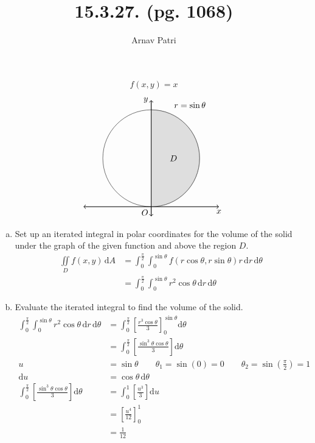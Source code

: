 \documentclass[12pt]{article}
\title{15.3.27. (pg. 1068)}
\author{Arnav Patri}
\renewcommand{\d}{\text{d}}
\begin{document}
	\maketitle
	\thispagestyle{empty}
	\[f(x, y) = x\]
	\[\begin{tikzpicture}[scale = 4]
		\draw[<->, thick] (-0.7, 0) -- (0.7, 0) node[below]{$x$};
		\draw[<->, thick] (0, -0.1) -- (0, 1.1) node[left]{$y$};
			\node[anchor = north east] at (0, 0) {$O$};
		\draw[radius = 0.5] (0, 0.5) circle;
		\draw[fill = lightgray, opacity = 0.5] (0, 0.5) -- (-90:0) arc(-90:90:0.5) -- cycle;
			\node at (0.23, 0.5) {$D$};
			\node at (0.4, 1.05){$r = \sin\theta$};
	\end{tikzpicture}\]
	\begin{enumerate}[(a)]
		\item
			Set up an iterated integral in polar coordinates for the volume of the solid under the graph of the given function and above the region $D$.
				\begin{align*}	
					\iint\limits_D f(x, y)\,\d A &= \int_0^{\frac{\pi}{2}}\int_0^{\sin\theta} f(r\cos\theta, r\sin\theta)r\,\d r\,\d\theta \\
						&= \int_0^{\frac{\pi}{2}}\int_0^{\sin\theta} r^2\cos\theta\,\d r\,\d\theta
				\end{align*}
		\item
			Evaluate the iterated integral to find the volume of the solid.
				\begin{align*}
					\int_0^{\frac{\pi}{2}}\int_0^{\sin\theta} r^2\cos\theta\,\d r\,\d\theta 
							&= \int_0^{\frac{\pi}{2}}\left[\frac{r^3\cos\theta}{3}\right]_0^{\sin\theta}\d\theta \\
						&= \int_0^{\frac{\pi}{2}}\left[\frac{\sin^3\theta\cos\theta}{3}\right]\d\theta \\
					u &= \sin\theta \qquad 
							\theta_1 = \sin(0) = 0 \qquad 
							\theta_2 = \sin\left(\frac{\pi}{2}\right) = 1 \\
					\d u &= \cos\theta\,\d\theta\\
					\int_0^{\frac{\pi}{2}}\left[\frac{\sin^3\theta\cos\theta}{3}\right]\d\theta
							&= \int_0^1\left[\frac{u^3}{3}\right]\d u \\
							&= \left[\frac{u^4}{12}\right]_0^1 \\
							&= \frac{1}{12}
				\end{align*}
	\end{enumerate}
\end{document}
